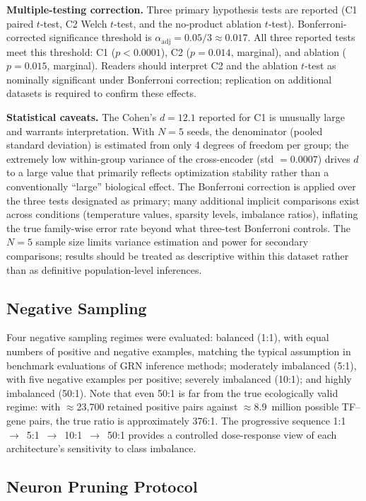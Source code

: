 \documentclass[journal]{IEEEtran}
\begin{document}
\textbf{Multiple-testing correction.}
Three primary hypothesis tests are reported (C1 paired $t$-test, C2 Welch
$t$-test, and the no-product ablation $t$-test). Bonferroni-corrected
significance threshold is $\alpha_{\text{adj}} = 0.05/3 \approx 0.017$.
All three reported tests meet this threshold: C1 ($p<0.0001$), C2 ($p=0.014$,
marginal), and ablation ($p=0.015$, marginal). Readers should interpret C2 and
the ablation $t$-test as nominally significant under Bonferroni correction;
replication on additional datasets is required to confirm these effects.

\textbf{Statistical caveats.}
The Cohen's $d = 12.1$ reported for C1 is unusually large and warrants
interpretation. With $N=5$ seeds, the denominator (pooled standard deviation)
is estimated from only 4 degrees of freedom per group; the extremely low
within-group variance of the cross-encoder (std $= 0.0007$) drives $d$ to a
large value that primarily reflects optimization stability rather than a
conventionally ``large'' biological effect. The Bonferroni correction is
applied over the three tests designated as primary; many additional implicit
comparisons exist across conditions (temperature values, sparsity levels,
imbalance ratios), inflating the true family-wise error rate beyond what
three-test Bonferroni controls. The $N=5$ sample size limits variance
estimation and power for secondary comparisons; results should be treated
as descriptive within this dataset rather than as definitive population-level
inferences.

\subsection{Negative Sampling}
\label{ssec:negsampling}

Four negative sampling regimes were evaluated: balanced (1:1), with equal
numbers of positive and negative examples, matching the typical assumption in
benchmark evaluations of GRN inference methods; moderately imbalanced (5:1),
with five negative examples per positive; severely imbalanced (10:1); and
highly imbalanced (50:1). Note that even 50:1 is far from the true
ecologically valid regime: with $\approx$23,700 retained positive pairs
against $\approx$8.9~million possible TF--gene pairs, the true ratio is
approximately 376:1. The progressive sequence 1:1~$\to$~5:1~$\to$~10:1~$\to$~50:1
provides a controlled dose-response view of each architecture's sensitivity
to class imbalance.

\subsection{Neuron Pruning Protocol}
\label{ssec:pruning}
\end{document}

